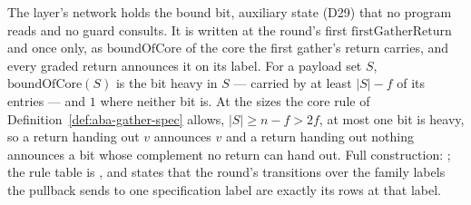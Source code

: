 \begin{definition}
  The layer's network holds the bound bit, auxiliary state (D29) that no program reads and no guard consults.
  It is written at the round's first $\mathrm{firstGatherReturn}$ and once only, as $\mathrm{boundOfCore}$ of the core the first gather's return carries, and every graded return announces it on its label.
  For a payload set $S$, $\mathrm{boundOfCore}(S)$ is the bit heavy in $S$ --- carried by at least $|S| - f$ of its entries --- and $1$ where neither bit is.
  At the sizes the core rule of Definition~\ref{def:aba-gather-spec} allows, $|S| \ge n - f > 2f$, at most one bit is heavy, so a return handing out $v$ announces $v$ and a return handing out nothing announces a bit whose complement no return can hand out.
  Full construction: ; the rule table is , and  states that the round's transitions over the family labels the pullback sends to one specification label are exactly its rows at that label.
\end{definition}
